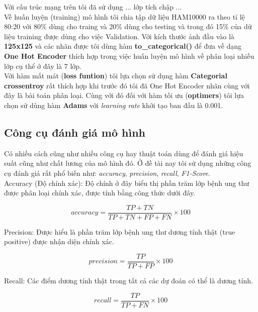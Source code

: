 \documentclass[12pt,a4paper]{article}
\begin{document}
	\noindent
	Với cấu trúc mạng trên tôi đã sử dụng ... lớp tích chập ...\\
	
	\noindent
	Về huấn luyện (training) mô hình tôi chia tập dữ liệu HAM10000 ra theo tỉ lệ 80:20 với 80\% dùng cho traing và 20\% dùng cho testing và trong đó 15\% của dữ liệu training được dùng cho việc Validation. Với kích thước ảnh đầu vào là \textbf{125x125} và các nhãn được tôi dùng hàm \textbf{to\_categorical()} để đưa về dạng \textbf{One Hot Encoder} thích hợp trong việc huấn luyện mô hình về phân loại nhiều lớp cụ thể ở đây là 7 lớp.\\
	
	\noindent
	Với hàm mất mát (\textbf{loss funtion}) tôi lựa chọn sử dụng hàm \textbf{Categorial crossentroy} rất thích hợp khi trước đó tôi đã One Hot Encoder nhãn cùng với đây là bài toán phân loại. Cùng với đó đối với hàm tối ưu (\textbf{optimers}) tôi lựa chọn sử dùng hàm \textbf{Adams} với \textit{learning rate} khởi tạo ban đầu là 0.001.
	
	\subsection{Công cụ đánh giá mô hình}
	Có nhiều cách cũng như nhiều công cụ hay thuật toán dùng để đánh giá hiệu suất cũng như chất lương của mô hình đó. Ở đề tài nay tôi sử dụng những công cụ đánh giá rất phổ biến như: \textit{accuracy}, \textit{precision}, \textit{recall}, \textit{F1-Score}.\\
	
	\noindent
	Accuracy (Độ chính xác): Độ chính ở đây biểu thị phần trăm lớp bệnh ung thư được phân loại chính xác, được tính bằng công thức dưới đây.
	
	\begin{equation}
		accuracy = \frac{TP + TN}{TP + TN + FP + FN}\times 100
	\end{equation}

	\noindent
	Precision: Được hiểu là phần trăm lớp bệnh ung thư dương tính thật (true positive) được nhận diện chính xác.
	
	\begin{equation}
		precision = \frac{TP}{TP + FP}\times 100
	\end{equation}

	\noindent
	Recall: Các điểm dương tính thật trong tất cả các dự đoán có thể là dương tính.
	
	\begin{equation}
		recall = \frac{TP}{TP + FN}\times 100
	\end{equation}
\end{document}
